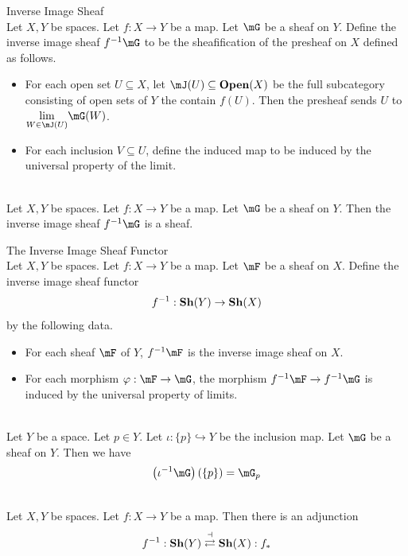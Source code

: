 \documentclass[a4paper]{article}
\begin{document}
\begin{defn}{Inverse Image Sheaf}{}\\
Let $X,Y$ be spaces. Let $f:X\to Y$ be a map. Let $\mG$ be a sheaf on $Y$. Define the inverse image sheaf $f^{-1}\mG$ to be the sheafification of the presheaf on $X$ defined as follows. 
\begin{itemize}
\item For each open set $U\subseteq X$, let $\mJ(U)\subseteq\bold{Open}(X)$ be the full subcategory consisting of open sets of $Y$ the contain $f(U)$. Then the presheaf sends $U$ to $\underset{W\in\mJ(U)}{\lim}\mG(W)$. 
\item For each inclusion $V\subseteq U$, define the induced map to be induced by the universal property of the limit. 
\end{itemize}
\end{defn}

\begin{prp}{}{}\\
Let $X,Y$ be spaces. Let $f:X\to Y$ be a map. Let $\mG$ be a sheaf on $Y$. Then the inverse image sheaf $f^{-1}\mG$ is a sheaf. 
\end{prp}

\begin{defn}{The Inverse Image Sheaf Functor}{}\\
Let $X,Y$ be spaces. Let $f:X\to Y$ be a map. Let $\mF$ be a sheaf on $X$. Define the inverse image sheaf functor $$f^{-1}:\bold{Sh}(Y)\to\bold{Sh}(X)$$ by the following data. 
\begin{itemize}
\item For each sheaf $\mF$ of $Y$, $f^{-1}\mF$ is the inverse image sheaf on $X$. 
\item For each morphism $\varphi:\mF\to\mG$, the morphism $f^{-1}\mF\to f^{-1}\mG$ is induced by the universal property of limits. 
\end{itemize}
\end{defn}

\begin{eg}{}{}\\
Let $Y$ be a space. Let $p\in Y$. Let $\iota:\{p\}\hookrightarrow Y$ be the inclusion map. Let $\mG$ be a sheaf on $Y$. Then we have $$\left(\iota^{-1}\mG\right)(\{p\})=\mG_p$$
\end{eg}

\begin{prp}{}{}\\
Let $X,Y$ be spaces. Let $f:X\to Y$ be a map. Then there is an adjunction $$f^{-1}:\bold{Sh}(Y)\overset{\dashv}{\rightleftarrows}\bold{Sh}(X):f_\ast$$
\end{prp}
\end{document}

